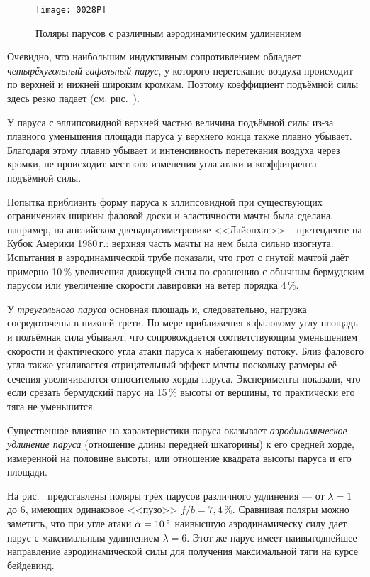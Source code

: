 \begin{figure}[htb]
  \centering
  \texttt{[image: 0028P]}
  \caption{Поляры парусов с различным аэродинамическим удлинением}
  \label{fig:28}
\end{figure}

Очевидно, что наибольшим индуктивным сопротивлением обладает
\textit{четырёхугольный гафельный парус}, у
которого перетекание воздуха происходит по верхней и нижней широким
кромкам. Поэтому коэффициент подъёмной силы здесь резко падает
(см. рис.~).

У паруса с эллипсовидной верхней частью величина подъёмной силы из-за
плавного уменьшения площади паруса у верхнего конца также плавно
убывает. Благодаря этому плавно убывает и интенсивность перетекания
воздуха через кромки, не происходит местного изменения угла атаки и
коэффициента подъёмной силы.

Попытка приблизить форму паруса к эллипсовидной при существующих
ограничениях ширины фаловой доски и эластичности мачты была сделана,
например, на английском двенадцатиметровике <<Лайонхат>> \---
претенденте на Кубок Америки 1980\,г.: верхняя часть мачты на нем была
сильно изогнута. Испытания в аэродинамической трубе показали, что грот
с гнутой мачтой даёт примерно 10\,\% увеличения движущей силы
по сравнению с обычным бермудским парусом или увеличение скорости
лавировки на ветер порядка 4\,\%.
 
У \textit{треугольного паруса} основная площадь и,
следовательно, нагрузка сосредоточены в нижней трети. По мере
приближения к фаловому углу площадь и подъёмная сила убывают, что
сопровождается соответствующим уменьшением скорости и фактического
угла атаки паруса к набегающему потоку. Близ фалового угла также
усиливается отрицательный эффект мачты поскольку размеры её сечения
увеличиваются относительно хорды паруса. Эксперименты показали, что
если срезать бермудский парус на 15\,\% высоты от вершины, то
практически его тяга не уменьшится.

Существенное влияние на характеристики паруса оказывает
\textit{аэродинамическое удлинение паруса}
(отношение длины передней шкаторины) к его средней хорде,
измеренной на половине высоты, или отношение квадрата высоты паруса и
его площади.

На рис.~ представлены поляры трёх парусов различного удлинения
--- от $\lambda = 1$ до 6, имеющих одинаковое <<пузо>>
$f/b=7,4\,\%$. Сравнивая поляры можно заметить, что при угле атаки
$\alpha = 10\,^\circ$ наивысшую аэродинамическу силу дает парус с
максимальным удлинением $\lambda = 6$. Этот же парус имеет
наивыгоднейшее направление аэродинамической силы для получения
максимальной тяги на курсе бейдевинд.

